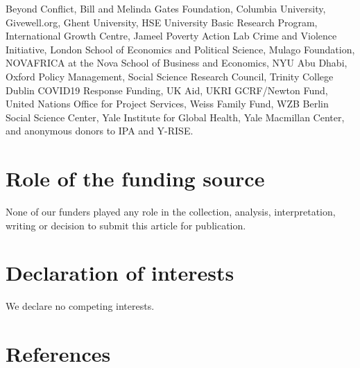 \documentclass[
  12pt,
]{article}
\begin{document}
Beyond Conflict, Bill and Melinda Gates Foundation, Columbia University, Givewell.org, Ghent University, HSE University Basic Research Program, International Growth Centre, Jameel Poverty Action Lab Crime and Violence Initiative, London School of Economics and Political Science, Mulago Foundation, NOVAFRICA at the Nova School of Business and Economics, NYU Abu Dhabi, Oxford Policy Management, Social Science Research Council, Trinity College Dublin COVID19 Response Funding, UK Aid, UKRI GCRF/Newton Fund, United Nations Office for Project Services, Weiss Family Fund, WZB Berlin Social Science Center, Yale Institute for Global Health, Yale Macmillan Center, and anonymous donors to IPA and Y-RISE.

\hypertarget{role-of-the-funding-source}{%
\section*{Role of the funding source}\label{role-of-the-funding-source}}

None of our funders played any role in the collection, analysis, interpretation, writing or decision to submit this article for publication.

\hypertarget{declaration-of-interests}{%
\section*{Declaration of interests}\label{declaration-of-interests}}

We declare no competing interests.

\newpage

\hypertarget{references}{%
\section*{References}\label{references}}
\end{document}
